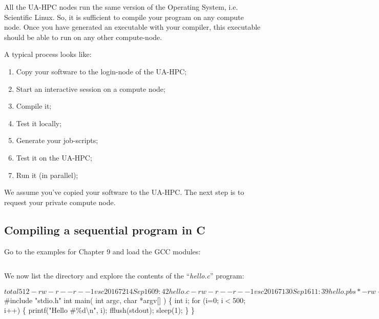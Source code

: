 All the UA-HPC nodes run the same version of the Operating System, i.e. Scientific Linux. So, it is sufficient to compile your program on any compute node.  Once you have generated an executable with your compiler, this executable should be able to run on any other compute-node.

A typical process looks like:

\begin{enumerate}
\item  Copy your software to the login-node of the UA-HPC;
\item  Start an interactive session on a compute node;
\item  Compile it;
\item  Test it locally;
\item  Generate your job-scripts;
\item  Test it on the UA-HPC;
\item  Run it (in parallel);
\end{enumerate}

We assume you've copied your software to the UA-HPC. The next step is to request your private compute node.

\subsection{Compiling a sequential program in C}

Go to the examples for Chapter 9 and load the GCC modules:
\begin{prompt}
$ %
$ %
\end{prompt}

We now list the directory and explore the contents of the ``\textit{hello.c}'' program:
\begin{prompt}
$ %
total 512
-rw-r--r-- 1 vsc20167 214 Sep 16 09:42 hello.c
-rw-r--r-- 1 vsc20167 130 Sep 16 11:39 hello.pbs*
-rw-r--r-- 1 vsc20167 359 Sep 16 13:55 mpi\_hello.c
-rw-r--r-- 1 vsc20167 304 Sep 16 13:55 mpi\_hello.pbs
$ %
\#include "stdio.h"
int main( int argc, char *argv[] )
\{
  int i;
  for (i=0; i$<$500; i++)
  \{
    printf("Hello \#\%d\textbackslash n", i);
    fflush(stdout);
    sleep(1);
  \}
\}
\end{prompt}

